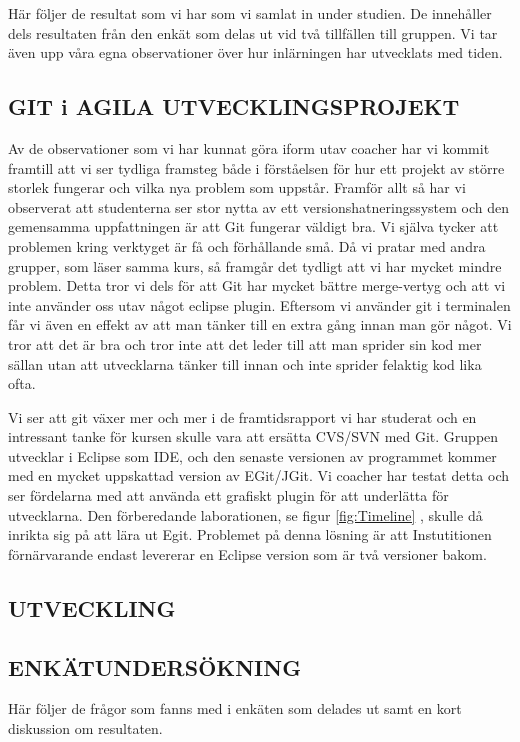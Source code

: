 Här följer de resultat som vi har som vi samlat in under studien. De innehåller dels resultaten från den enkät som delas ut vid två tillfällen till gruppen. Vi tar även upp våra egna observationer över hur inlärningen har utvecklats med tiden. 

\subsection{GIT i AGILA UTVECKLINGSPROJEKT}
Av de observationer som vi har kunnat göra iform utav coacher har vi kommit framtill att vi ser tydliga framsteg både i förståelsen för hur ett projekt av större storlek fungerar och vilka nya problem som uppstår. Framför allt så har vi observerat att studenterna ser stor nytta av ett versionshatneringssystem och den gemensamma uppfattningen är att Git fungerar väldigt bra. Vi själva tycker att problemen kring verktyget är få och förhållande små. Då vi pratar med andra grupper, som läser samma kurs, så framgår det tydligt att vi har mycket mindre problem. Detta tror vi dels för att Git har mycket bättre merge-vertyg och att vi inte använder oss utav något eclipse plugin. Eftersom vi använder git i terminalen får vi även en effekt av att man tänker till en extra gång innan man gör något. Vi tror att det är bra och tror inte att det leder till att man sprider sin kod mer sällan utan att utvecklarna tänker till innan och inte sprider felaktig kod lika ofta. 

Vi ser att git växer mer och mer i de framtidsrapport vi har studerat och en intressant tanke för kursen skulle vara att ersätta CVS/SVN med Git. Gruppen utvecklar i Eclipse som IDE, och den senaste versionen av programmet kommer med en mycket uppskattad version av EGit/JGit. Vi coacher har testat detta och ser fördelarna med att använda ett grafiskt plugin för att underlätta för utvecklarna. Den förberedande laborationen, se figur \ref{fig:Timeline} , skulle då inrikta sig på att lära ut Egit. Problemet på denna lösning är att Instutitionen förnärvarande endast levererar en Eclipse version som är två versioner bakom. 

\subsection{UTVECKLING}
\subsection{ENKÄTUNDERSÖKNING}
Här följer de frågor som fanns med i enkäten som delades ut samt en kort diskussion om resultaten.

